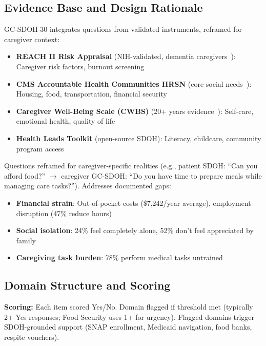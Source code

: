 \documentclass{article}
\begin{document}
\subsection{Evidence Base and Design Rationale}%
GC-SDOH-30 integrates questions from validated instruments, reframed for caregiver context:

\begin{itemize}[leftmargin=*,noitemsep]
    \item \textbf{REACH II Risk Appraisal} (NIH-validated, dementia caregivers~\cite{bella2006}): Caregiver risk factors, burnout screening
    \item \textbf{CMS Accountable Health Communities HRSN} (core social needs~\cite{ahc}): Housing, food, transportation, financial security
    \item \textbf{Caregiver Well-Being Scale (CWBS)} (20+ years evidence~\cite{tebb1995,tebb2013}): Self-care, emotional health, quality of life
    \item \textbf{Health Leads Toolkit} (open-source SDOH): Literacy, childcare, community program access
\end{itemize}

Questions reframed for caregiver-specific realities (e.g., patient SDOH: ``Can you afford food?'' $\rightarrow$ caregiver GC-SDOH: ``Do you have time to prepare meals while managing care tasks?''). Addresses documented gaps:
\begin{itemize}[leftmargin=*,noitemsep]
    \item \textbf{Financial strain}: Out-of-pocket costs (\$7,242/year average), employment disruption (47\% reduce hours)
    \item \textbf{Social isolation}: 24\% feel completely alone, 52\% don't feel appreciated by family
    \item \textbf{Caregiving task burden}: 78\% perform medical tasks untrained
\end{itemize}

\subsection{Domain Structure and Scoring}%
\textbf{Scoring:} Each item scored Yes/No. Domain flagged if threshold met (typically 2+ Yes responses; Food Security uses 1+ for urgency). Flagged domains trigger SDOH-grounded support (SNAP enrollment, Medicaid navigation, food banks, respite vouchers).
\end{document}
